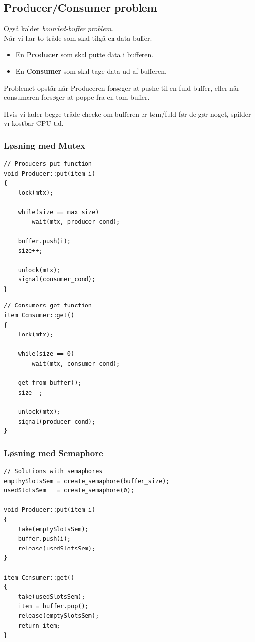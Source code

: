 \subsection{Producer/Consumer problem}
Også kaldet \textit{bounded-buffer problem}.\\

Når vi har to tråde som skal tilgå en data buffer.

\begin{itemize}
	\item En \textbf{Producer} som skal putte data i bufferen.
	\item En \textbf{Consumer} som skal tage data ud af bufferen.
\end{itemize}

Problemet opstår når Produceren forsøger at pushe til en fuld buffer, eller når consumeren forsøger at poppe fra en tom buffer.

Hvis vi lader begge tråde checke om bufferen er tøm/fuld før de gør noget, spilder vi kostbar CPU tid.

\subsubsection{Løsning med Mutex}

\begin{lstlisting}[otherkeywords={item, buffer, unlock, lock, signal}]
// Producers put function
void Producer::put(item i)
{
	lock(mtx);
	
	while(size == max_size)
		wait(mtx, producer_cond);
		
	buffer.push(i);
	size++;
	
	unlock(mtx);
	signal(consumer_cond);
}
\end{lstlisting}

\begin{lstlisting}
// Consumers get function
item Comsumer::get()
{
	lock(mtx);
	
	while(size == 0)
		wait(mtx, consumer_cond);
		
	get_from_buffer();
	size--;
	
	unlock(mtx);
	signal(producer_cond);
}
\end{lstlisting}

\subsubsection{Løsning med Semaphore}
\begin{lstlisting}[otherkeywords={create_semaphore, take, push, release, item}]
// Solutions with semaphores
empthySlotsSem = create_semaphore(buffer_size);
usedSlotsSem   = create_semaphore(0);

void Producer::put(item i)
{
	take(emptySlotsSem);
	buffer.push(i);
	release(usedSlotsSem);
}

item Consumer::get()
{
	take(usedSlotsSem);
	item = buffer.pop();
	release(emptySlotsSem);
	return item;
}
\end{lstlisting}


